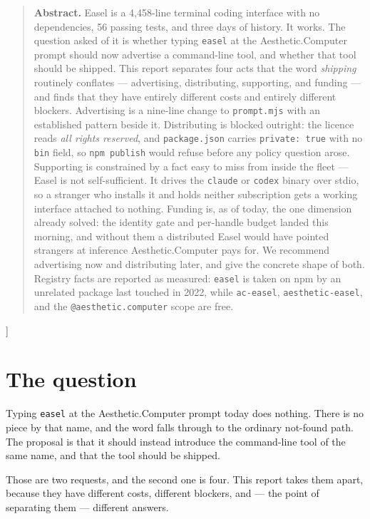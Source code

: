 \documentclass[10pt,letterpaper,twocolumn]{article}
\newcommand{\acdot}{{\color{acpink}.}}
\newcommand{\ac}{Aesthetic{\acdot}Computer}
\newcommand{\code}[1]{\texttt{#1}}
\begin{document}
{\begin{quote}
\small\noindent\textbf{Abstract.}
Easel is a 4{,}458-line terminal coding interface with no dependencies, 56
passing tests, and three days of history. It works. The question asked of it is
whether typing \code{easel} at the \ac{} prompt should now advertise a command-line
tool, and whether that tool should be shipped. This report separates four acts
that the word \emph{shipping} routinely conflates --- advertising, distributing,
supporting, and funding --- and finds that they have entirely different costs and
entirely different blockers. Advertising is a nine-line change to
\code{prompt.mjs} with an established pattern beside it. Distributing is blocked
outright: the licence reads \emph{all rights reserved}, and
\code{package.json} carries \code{private: true} with no \code{bin} field, so
\code{npm publish} would refuse before any policy question arose. Supporting is
constrained by a fact easy to miss from inside the fleet --- Easel is not
self-sufficient. It drives the \code{claude} or \code{codex} binary over stdio,
so a stranger who installs it and holds neither subscription gets a working
interface attached to nothing. Funding is, as of today, the one dimension
already solved: the identity gate and per-handle budget landed this morning, and
without them a distributed Easel would have pointed strangers at inference
\ac{} pays for. We recommend advertising now and distributing later, and give
the concrete shape of both. Registry facts are reported as measured: \code{easel}
is taken on npm by an unrelated package last touched in 2022, while
\code{ac-easel}, \code{aesthetic-easel}, and the \code{@aesthetic.computer} scope
are free.
\end{quote}
\vspace{0.5em}
}]

\section{The question}

Typing \code{easel} at the \ac{} prompt today does nothing. There is no piece by
that name, and the word falls through to the ordinary not-found path. The
proposal is that it should instead introduce the command-line tool of the same
name, and that the tool should be shipped.

Those are two requests, and the second one is four. This report takes them
apart, because they have different costs, different blockers, and --- the point
of separating them --- different answers.
\end{document}
